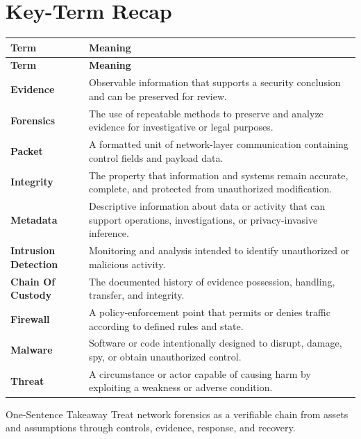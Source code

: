 \documentclass[11pt,letterpaper]{article}
\begin{document}
\section*{Key-Term Recap}
\begin{longtable}{>{\raggedright\arraybackslash}p{}>{\raggedright\arraybackslash}p{}}
\toprule\rowcolor{Navy}\color{white}\textbf{Term} & \color{white}\textbf{Meaning}\\\midrule
\endfirsthead
\toprule\rowcolor{Navy}\color{white}\textbf{Term} & \color{white}\textbf{Meaning}\\\midrule
\endhead
\textbf{Evidence} & Observable information that supports a security conclusion and can be preserved for review. \\\midrule
\textbf{Forensics} & The use of repeatable methods to preserve and analyze evidence for investigative or legal purposes. \\\midrule
\textbf{Packet} & A formatted unit of network-layer communication containing control fields and payload data. \\\midrule
\textbf{Integrity} & The property that information and systems remain accurate, complete, and protected from unauthorized modification. \\\midrule
\textbf{Metadata} & Descriptive information about data or activity that can support operations, investigations, or privacy-invasive inference. \\\midrule
\textbf{Intrusion Detection} & Monitoring and analysis intended to identify unauthorized or malicious activity. \\\midrule
\textbf{Chain Of Custody} & The documented history of evidence possession, handling, transfer, and integrity. \\\midrule
\textbf{Firewall} & A policy-enforcement point that permits or denies traffic according to defined rules and state. \\\midrule
\textbf{Malware} & Software or code intentionally designed to disrupt, damage, spy, or obtain unauthorized control. \\\midrule
\textbf{Threat} & A circumstance or actor capable of causing harm by exploiting a weakness or adverse condition. \\\midrule
\bottomrule
\end{longtable}
\begin{CornellExamBox}{One-Sentence Takeaway}
Treat network forensics as a verifiable chain from assets and assumptions through controls, evidence, response, and recovery.
\end{CornellExamBox}
\end{document}
